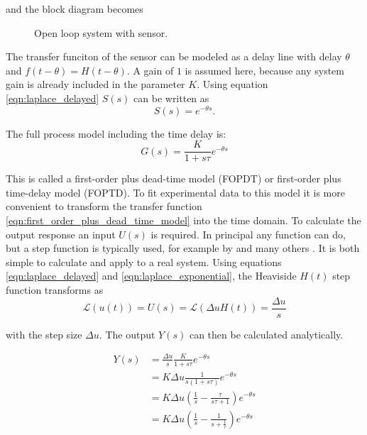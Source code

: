 and the block diagram becomes

\begin{figure}[ht]
    \centering
    \caption{Open loop system with sensor.}
\end{figure}

The transfer funciton of the sensor can be modeled as a delay line with delay $\theta$ and $f(t-\theta) = H(t-\theta)$. A gain of $1$ is assumed here, because any system gain is already included in the parameter $K$. Using equation \ref{eqn:laplace_delayed} $S(s)$ can be written as
\begin{equation}
    S(s) = e^{-\theta s} .
\end{equation}

The full process model including the time delay is:
\begin{equation}
    G(s) = \frac{K}{1 + s\tau} e^{-\theta s} \label{eqn:first_order_plus_dead_time_model}
\end{equation}

This is called a first-order plus dead-time model (FOPDT) or first-order plus time-delay model (FOPTD). To fit experimental data to this model it is more convenient to transform the transfer function \ref{eqn:first_order_plus_dead_time_model} into the time domain. To calculate the output response an input $U(s)$ is required. In principal any function can do, but a step function is typically used, for example by \citeauthor{ziegler_nichols} \cite{ziegler_nichols} and many others \cite{tuning_rules,pessen_integral,simc,smic2,pid_controllers_for_time_delay_systems,pi_stabilization_of_fopdt_systems, pid_basics}. It is both simple to calculate and apply to a real system. Using equations \ref{eqn:laplace_delayed} and \ref{eqn:laplace_exponential}, the Heaviside $H(t)$ step function transforms as
\begin{equation}
    \mathscr{L} \left(u(t) \right) = U(s) = \mathscr{L} \left( \Delta u H(t) \right) = \frac{\Delta u}{s}
\end{equation}

with the step size $\Delta u$. The output $Y(s)$ can then be calculated analytically.

\begin{align}
    Y(s) &= \frac{\Delta u}{s} \frac{K}{1 + s\tau} e^{-\theta s} \nonumber\\
    &=  K \Delta u \frac{1}{s (1 + s\tau)} e^{-\theta s} \nonumber\\
    &= K \Delta u \left(\frac{1}{s} - \frac{\tau}{s\tau+1} \right) e^{-\theta s} \nonumber\\
    &= K \Delta u \left(\frac{1}{s} - \frac{1}{s+\frac{1}{\tau}} \right) e^{-\theta s}
\end{align}

